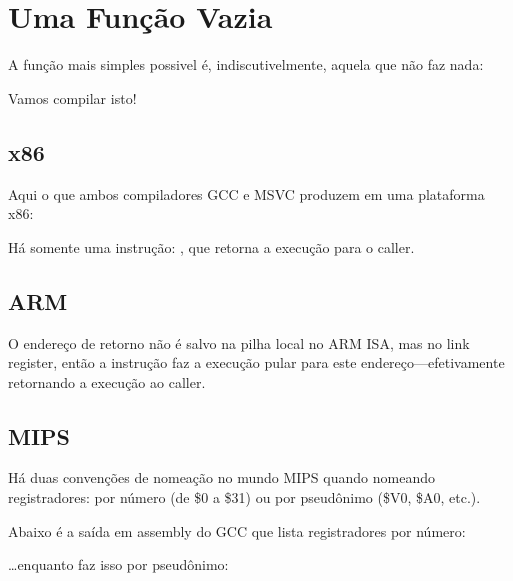 \section{Uma Função Vazia}
\label{empty_func}

A função mais simples possivel é, indiscutivelmente, aquela que não faz nada:



Vamos compilar isto!

\subsection{x86}

Aqui o que ambos compiladores GCC e MSVC produzem em uma plataforma x86:



Há somente uma instrução: \RET, que retorna a execução para o \gls{caller}.

\subsection{ARM}



O endereço de retorno não é salvo na pilha local no ARM \ac{ISA}, mas no link register,
então a instrução  faz a execução pular para este endereço---efetivamente retornando a execução
ao \gls{caller}.

\subsection{MIPS}

Há duas convenções de nomeação no mundo MIPS quando nomeando registradores: 
por número (de \$0 a \$31) ou por pseudônimo (\$V0, \$A0, etc.).

Abaixo é a saída em assembly do GCC que lista registradores por número:



\dots enquanto \IDA faz isso por pseudônimo:



